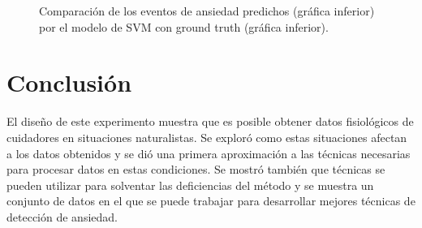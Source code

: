 \begin{figure}[h!]
        \centering
        \caption{Comparaci\'on de los eventos de ansiedad predichos (gr\'afica inferior) por el modelo de SVM con ground truth (gr\'afica inferior).}\label{fig:gtvspredict}

\end{figure}

\section{Conclusi\'on}
	El dise\~no de este experimento muestra que es posible obtener datos fisiol\'ogicos de cuidadores en situaciones naturalistas. Se explor\'o como estas situaciones afectan a los datos obtenidos y se di\'o una primera aproximaci\'on a las t\'ecnicas necesarias para procesar datos en estas condiciones. Se mostr\'o tambi\'en que t\'ecnicas se pueden utilizar para solventar las deficiencias del m\'etodo y se muestra un conjunto de datos en el que se puede trabajar para desarrollar mejores t\'ecnicas de detecci\'on de ansiedad.
\newpage
